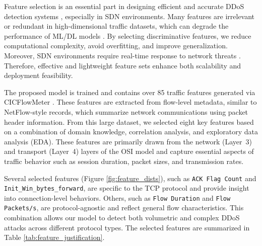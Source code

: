 \documentclass[ASNA,twocolumn]{USG} %
\begin{document}
Feature selection is an essential part in designing efficient and accurate DDoS detection systems \cite{chanu2023dynamic}, especially in SDN environments. Many features are irrelevant or redundant in high-dimensional traffic datasets, which can degrade the performance of ML/DL models \cite{rane2024machine}. By selecting discriminative features, we reduce computational complexity, avoid overfitting, and improve generalization. Moreover, SDN environments require real-time response to network threats \cite{de2020near}. Therefore, effective and lightweight feature sets enhance both scalability and deployment feasibility.

The proposed model is trained and contains over 85 traffic features generated via CICFlowMeter \cite{ali2022ddos}. These features are extracted from flow-level metadata, similar to NetFlow-style records, which summarize network communications using packet header information. From this large dataset, we selected eight key features based on a combination of domain knowledge, correlation analysis, and exploratory data analysis (EDA). These features are primarily drawn from the network (Layer~3) and transport (Layer~4) layers of the OSI model and capture essential aspects of traffic behavior such as session duration, packet sizes, and transmission rates.

Several selected features (Figure \ref{fig:feature_dists}), such as \texttt{ACK Flag Count} and \texttt{Init\_Win\_bytes\_forward}, are specific to the TCP protocol and provide insight into connection-level behaviors. Others, such as \texttt{Flow Duration} and \texttt{Flow Packets/s}, are protocol-agnostic and reflect general flow characteristics. This combination allows our model to detect both volumetric and complex DDoS attacks across different protocol types. The selected features are summarized in Table \ref{tab:feature_justification}.

\end{document}
